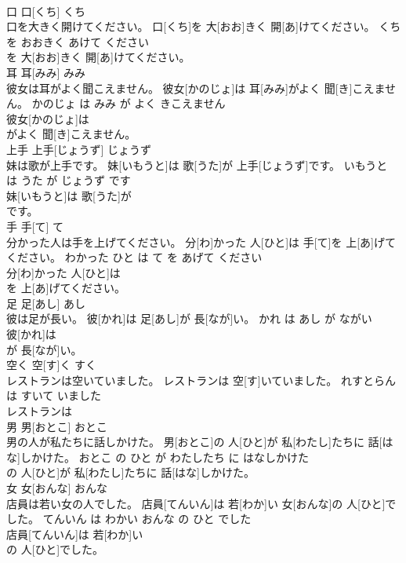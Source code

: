 \documentclass[8pt]{extreport}
\begin{document}
\begin{CJK}{UTF8}{min}
\\	口	口[くち]	くち	
\\	口を大きく開けてください。	口[くち]を 大[おお]きく 開[あ]けてください。	くち を おおきく あけて ください	
\\	を 大[おお]きく 開[あ]けてください。			
\\	耳	耳[みみ]	みみ	
\\	彼女は耳がよく聞こえません。	彼女[かのじょ]は 耳[みみ]がよく 聞[き]こえません。	かのじょ は みみ が よく きこえません	
\\	彼女[かのじょ]は
\\	がよく 聞[き]こえません。			
\\	上手	上手[じょうず]	じょうず	
\\	妹は歌が上手です。	妹[いもうと]は 歌[うた]が 上手[じょうず]です。	いもうと は うた が じょうず です	
\\	妹[いもうと]は 歌[うた]が
\\	です。			
\\	手	手[て]	て	
\\	分かった人は手を上げてください。	分[わ]かった 人[ひと]は 手[て]を 上[あ]げてください。	わかった ひと は て を あげて ください	
\\	分[わ]かった 人[ひと]は
\\	を 上[あ]げてください。			
\\	足	足[あし]	あし	
\\	彼は足が長い。	彼[かれ]は 足[あし]が 長[なが]い。	かれ は あし が ながい	
\\	彼[かれ]は
\\	が 長[なが]い。			
\\	空く	空[す]く	すく	
\\	レストランは空いていました。	レストランは 空[す]いていました。	れすとらん は すいて いました	
\\	レストランは
\\	男	男[おとこ]	おとこ	
\\	男の人が私たちに話しかけた。	男[おとこ]の 人[ひと]が 私[わたし]たちに 話[はな]しかけた。	おとこ の ひと が わたしたち に はなしかけた	
\\	の 人[ひと]が 私[わたし]たちに 話[はな]しかけた。			
\\	女	女[おんな]	おんな	
\\	店員は若い女の人でした。	店員[てんいん]は 若[わか]い 女[おんな]の 人[ひと]でした。	てんいん は わかい おんな の ひと でした	
\\	店員[てんいん]は 若[わか]い
\\	の 人[ひと]でした。			

\end{CJK}
\end{document}
